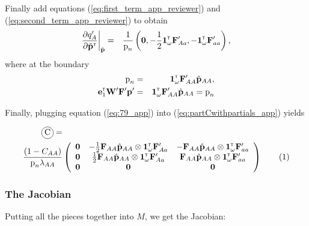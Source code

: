 \documentclass[11pt]{article}
\newcommand\encircle[1]{%
  \tikz[baseline=(X.base)] 
    \node (X) [draw, shape=circle, inner sep=0] {\strut #1};}
\newcommand\numberthis{\addtocounter{equation}{1}\tag{\theequation}}
\def\mbf#1{\mathbf{#1}}
\newcommand{\bo}[1]{{\bf #1}}
\newcommand{\tr}{{\mbox{\tiny \sf T}}}
\begin{document}
Finally add equations (\ref{eq:first_term_app_reviewer}) and (\ref{eq:second_term_app_reviewer}) to obtain
\begin{eqnarray}
  \frac{\partial   q^\prime_A }{\partial \tilde{\bo p}^\tr}\bigg\rvert_{\hat{\bo p}}&=& \frac{1}{ \mbox{p}_{n}} \left( \mathbf{0},  -\frac{1}{2}\mathbf{1}^\tr_{\omega} \mathbf{F}_{Aa}^\prime, -\mathbf{1}^\tr_{\omega} \mathbf{F}_{aa}^\prime \right) \label{eq:79_app},
\end{eqnarray}
where at the boundary
\begin{eqnarray}
  \mbox{p}_{n}&=&\mathbf{1}^\tr_\omega \mathbf{F}_{AA}^\prime \hat{\mathbf{p}}_{AA}, \\
  \mathbf{e}_1^\tr \mathbf{W}^\prime \mathbf{F}^\prime \mathbf{p}^\prime&=&\mathbf{1}^\tr_\omega \mathbf{F}_{AA}^\prime \hat{\mathbf{p}}_{AA}=  \mbox{p}_{n}
\end{eqnarray}


Finally, plugging equation (\ref{eq:79_app}) into (\ref{eq:partCwithpartials_app}) yields

{
\begin{align*}
	\encircle{C} =& \\
	\frac{(1 - C_{AA})}{\mbox{p}_{n}\lambda_{AA}} &\left(
			\begin{array}{ccc}
				\mbf{0}   & -\frac{1}{2} \mbf{F}_{AA} \hat{\mbf{p}}_{AA} \otimes \mathbf{1}^\tr_{\omega} \mathbf{F}_{Aa}^\prime&  - \mbf{F}_{AA} \hat{\mbf{p}}_{AA} \otimes \mathbf{1}^\tr_{\omega} \mathbf{F}_{aa}^\prime \\ 
						\mbf{0}   & \frac{1}{2} \mbf{F}_{AA} \hat{\mbf{p}}_{AA} \otimes \mathbf{1}^\tr_{\omega} \mathbf{F}_{Aa}^\prime&  \mbf{F}_{AA} \hat{\mbf{p}}_{AA}  \otimes \mathbf{1}^\tr_{\omega} \mathbf{F}_{aa}^\prime \\  
				\mbf{0} & \mbf{0} & \mbf{0} 
			\end{array} \right)  \numberthis			
\end{align*}
}




\subsubsection{The Jacobian}

Putting all the pieces together into $M$, we get the Jacobian:
\end{document}
